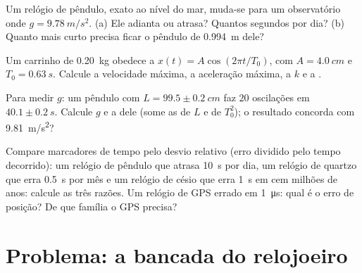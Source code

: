 \begin{exercise}[$\star\star\star$]\label{exo:g12:oscillators-and-time:12}
Um relógio de pêndulo, exato ao nível do mar, muda-se para um observatório onde
$g = \qty{9.78}{m/s^2}$. (a) Ele adianta ou atrasa? Quantos segundos por dia? (b)
Quanto mais curto precisa ficar o pêndulo de \qty{0.994}{m} dele?
\end{exercise}

\begin{exercise}[$\star\star\star$]\label{exo:g12:oscillators-and-time:13}
Um carrinho de \qty{0.20}{kg} obedece a $x(t) = A\cos(2\pi t/T_0)$, com
$A = \qty{4.0}{cm}$ e $T_0 = \qty{0.63}{s}$. Calcule a velocidade máxima, a aceleração
máxima, a  $k$ e a .
\end{exercise}

\begin{exercise}[$\star\star\star$]\label{exo:g12:oscillators-and-time:14}
Para medir $g$: um pêndulo com $L = 99.5 \pm \qty{0.2}{cm}$ faz $20$ oscilações em
$40.1 \pm \qty{0.2}{s}$. Calcule $g$ e a  dele (some as de $L$ e de
$T_0^2$); o resultado concorda com \qty{9.81}{m/s^2}?
\end{exercise}

\begin{exercise}[$\star\star\star$]\label{exo:g12:oscillators-and-time:15}
Compare marcadores de tempo pelo desvio relativo (erro dividido pelo tempo decorrido):
um relógio de pêndulo que atrasa \qty{10}{s} por dia, um relógio de quartzo que erra
\qty{0.5}{s} por mês e um relógio de césio que erra \qty{1}{s} em cem milhões de anos:
calcule as três razões. Um relógio de GPS errado em \qty{1}{\micro s}: qual é o erro de
posição? De que família o GPS precisa?
\end{exercise}

\section{Problema: a bancada do relojoeiro}

